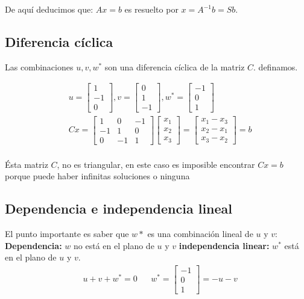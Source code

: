 De aquí deducimos que: $Ax=b$ es resuelto por $x=A^{-1}b=Sb$.

\subsection{Diferencia cíclica}
Las combinaciones $u,v,w^*$ son una diferencia cíclica de la matriz $C$.
definamos.

\begin{align*}
	 & u=\begin{bmatrix} 1\\ -1\\ 0 \end{bmatrix}, v=\begin{bmatrix} 0\\ 1\\ -1 \end{bmatrix}, w^{*}=\begin{bmatrix} -1\\ 0\\ 1 \end{bmatrix}                                                               \\
	 & Cx=\begin{bmatrix} 1 & 0 &-1 \\ -1 & 1 &0 \\ 0 &-1 & 1 \end{bmatrix} \begin{bmatrix} x_{1}\\ x_2 \\ x_3 \end{bmatrix} = \begin{bmatrix} x_{1}-x_3 \\ x_2 -x_1\\ x_{3}-x_2\end{bmatrix}=b \\
\end{align*}

Ésta matriz $C$, no es triangular, en este caso es imposible encontrar $Cx=b$ porque puede haber infinitas soluciones o ninguna

\subsection{Dependencia e independencia lineal}

El punto importante es saber que $w*$ es una combinación lineal de $u$ y $v$:
\textbf{Dependencia:} $w$ no está en el plano de $u$ y $v$
\textbf{independencia linear:} $w^*$ está en el plano de $u$ y $v$.
\begin{align*}
	 & u+v+w^{*}=0 &  & w^{*}= \begin{bmatrix} -1\\ 0\\ 1 \end{bmatrix}=-u-v
\end{align*}


